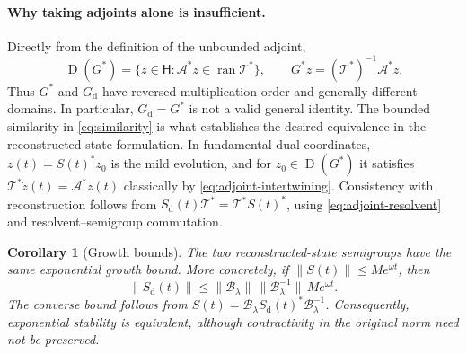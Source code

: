 \documentclass[11pt,a4paper]{article}
\newtheorem{corollary}[proposition]{Corollary}
\newcommand{\StateSpace}{\mathsf H}
\newcommand{\OpT}{\mathcal T}
\newcommand{\OpA}{\mathcal A}
\newcommand{\OpB}{\mathcal B_\lambda}
\DeclareMathOperator{\ran}{ran}
\DeclareMathOperator{\Dom}{D}
\begin{document}
\paragraph{Why taking adjoints alone is insufficient.}
Directly from the definition of the unbounded adjoint,
\[
 \Dom(G^*)=\{z\in\StateSpace:\OpA^*z\in\ran\OpT^*\},
 \qquad
 G^*z=(\OpT^*)^{-1}\OpA^*z.
\]
Thus $G^*$ and $G_{\mathrm d}$ have reversed multiplication order
and generally different domains. In particular,
$G_{\mathrm d}=G^*$ is not a valid general identity.
The bounded similarity in \eqref{eq:similarity} is what establishes
the desired equivalence in the reconstructed-state formulation.
In fundamental dual coordinates, $z(t)=S(t)^*z_0$ is the mild
evolution, and for $z_0\in\Dom(G^*)$ it satisfies
$\OpT^*\dot z(t)=\OpA^*z(t)$ classically by
\eqref{eq:adjoint-intertwining}. Consistency with reconstruction follows
from $S_{\mathrm d}(t)\OpT^*=\OpT^*S(t)^*$, using
\eqref{eq:adjoint-resolvent} and resolvent--semigroup commutation.

\begin{corollary}[Growth bounds]
The two reconstructed-state semigroups have the same exponential growth
bound. More concretely, if $\|S(t)\|\leq M e^{\omega t}$, then
\[
 \|S_{\mathrm d}(t)\|
 \leq\|\OpB\|\,\|\OpB^{-1}\|\,M e^{\omega t}.
\]
The converse bound follows from
$S(t)=\OpB S_{\mathrm d}(t)^*\OpB^{-1}$.
Consequently, exponential stability is equivalent, although contractivity
in the original norm need not be preserved.
\end{corollary}
\end{document}

